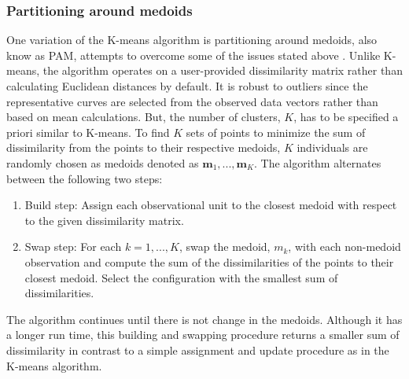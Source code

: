 \documentclass[12pt]{article}
\newcommand{\B}[0]{\mathbf}
\begin{document}
 \subsubsection{Partitioning around medoids}
 One variation of the K-means algorithm is partitioning around medoids, also know as PAM, attempts to overcome some of the issues stated above \cite{kaufman1990}.  Unlike K-means, the algorithm operates on a user-provided dissimilarity matrix rather than calculating Euclidean distances by default. It is robust to outliers since the representative curves are selected from the observed data vectors rather than based on mean calculations. But, the number of clusters, $K$, has to be specified a priori similar to K-means. To find $K$ sets of points to minimize the sum of dissimilarity from the points to their respective medoids, $K$ individuals are randomly chosen as medoids denoted as $\B m_{1},...,\B m_{K}$. The algorithm alternates between the following two steps:
 \begin{enumerate}
\item Build step: Assign each observational unit to the closest medoid with respect to the given dissimilarity matrix.
\item Swap step: For each $k=1,...,K$, swap the medoid, $m_{k}$, with each non-medoid observation and compute the sum of the dissimilarities of the points to their closest medoid. Select the configuration with the smallest sum of dissimilarities.
\end{enumerate}
The algorithm continues until there is not change in the medoids. Although it has a longer run time, this building and swapping procedure returns a smaller sum of dissimilarity in contrast to a simple assignment and update procedure as in the K-means algorithm. 
\end{document}
